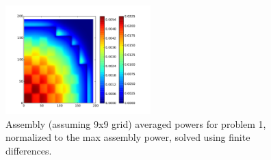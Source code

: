 \documentclass[12pt]{article}
\newenvironment{solnum}[2][Solution]{\begin{trivlist}
\item[\hskip \labelsep {\bfseries #1}\hskip \labelsep {\bfseries #2:}]\hspace{0.3in}\newline\newline}{\end{trivlist}}
\begin{document}
\begin{solnum}{1-1}
\begin{figure}
    \centering
    \caption{Assembly (assuming 9x9 grid) averaged powers for problem 1, normalized
    to the max assembly power, solved using finite differences.}
    \includegraphics[width=0.5\textwidth]{prob1_diff_g2.pdf}
\end{figure}

\end{solnum}
\clearpage
\end{document}

